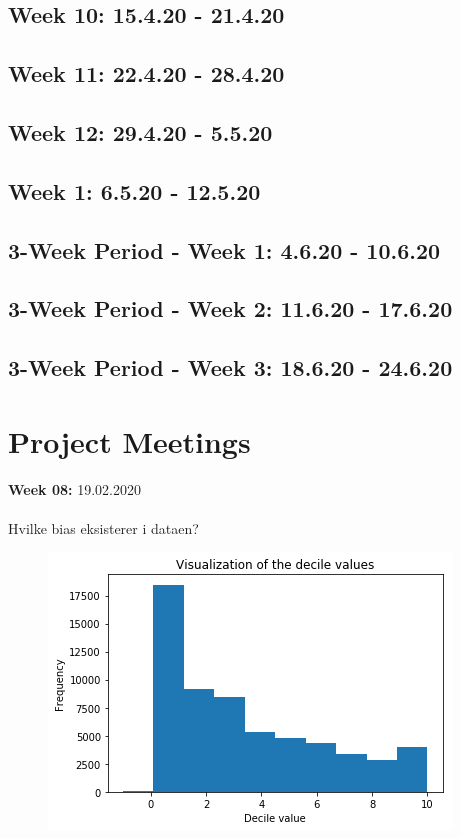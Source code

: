 \documentclass[11pt, fleqn]{article}
\begin{document}
\subsection*{Week 10: 15.4.20 - 21.4.20}


\subsection*{Week 11: 22.4.20 - 28.4.20}


\subsection*{Week 12: 29.4.20 - 5.5.20}


\subsection*{Week 1: 6.5.20 - 12.5.20}


\subsection*{3-Week Period - Week 1: 4.6.20 - 10.6.20}


\subsection*{3-Week Period - Week 2: 11.6.20 - 17.6.20}


\subsection*{3-Week Period - Week 3: 18.6.20 - 24.6.20}


		
\newpage
\newpage
\section*{Project Meetings}
	
	
	\textbf{Week 08:}  19.02.2020 \\\\
	\noindent
	Hvilke bias eksisterer i dataen? \\ 
	\begin{figure}[H]
		\centering
		\includegraphics[width=0.3\linewidth]{billeder/decil.png}
	\end{figure}
\end{document}
